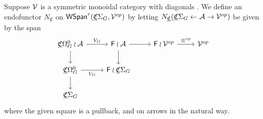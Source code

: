\documentclass[a4paper,10pt
,draft
]{article}%
\newcommand{\UC}{\underline{\mathfrak C}}
\begin{document}
\begin{definition}[{cf. \cite[Defn 4.16]{BP17}}]
      Suppose $\mathcal V$ is a symmetric monoidal category with diagonals .
      We define an endofunctor $N_{\UC}$ on $\mathsf{WSpan}^r(\UC\Sigma_G, \V^{op})$
      by letting $N_{\UC}(\UC\Sigma_G \leftarrow \mathcal A \to \V^{op})$ be given by the span
      \begin{equation}
            \begin{tikzcd}
                  \UC\Omega_G^0 \wr \mathcal A \arrow[d] \arrow[r, "V_G"]
                  &
                  \mathsf F \wr \mathcal A \arrow[d] \arrow[r]
                  &
                  \mathsf F \wr \V^{op} \arrow[r, "\otimes^{op}"]
                  &
                  \V^{op}
                  \\
                  \UC\Omega_G^0 \arrow[r, "V_G"'] \arrow[d]
                  &
                  \mathsf F \wr \UC\Sigma_G
                  \\
                  \UC\Sigma_G
            \end{tikzcd}
      \end{equation}
      where the given square is a pullback, and on arrows in the natural way.


\end{definition}
\end{document}
